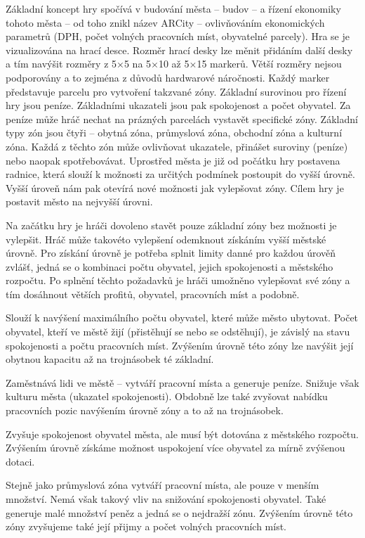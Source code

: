 \documentclass[twoside,12pt]{article}
\begin{document}
Základní koncept hry spočívá v budování města -- budov -- a řízení ekonomiky tohoto města -- od toho znikl název ARCity -- ovlivňováním ekonomických parametrů (DPH, počet volných pracovních míst, obyvatelné parcely). Hra se je vizualizována na hrací desce. Rozměr hrací desky lze měnit přidáním další desky a tím navýšit rozměry z 5$\times$5 na 5$\times$10 až 5$\times$15 markerů. Větší rozměry nejsou podporovány a to zejména z důvodů hardwarové náročnosti. Každý marker představuje parcelu pro vytvoření takzvané zóny. Základní surovinou pro řízení hry jsou peníze. Základními ukazateli jsou pak spokojenost a počet obyvatel.  Za peníze může hráč nechat na prázných parcelách vystavět specifické zóny. Základní typy zón jsou čtyři -- obytná zóna, průmyslová zóna, obchodní zóna a kulturní zóna. Každá z těchto zón může ovlivňovat ukazatele, přinášet suroviny (peníze) nebo naopak spotřebovávat. Uprostřed města je již od počátku hry postavena radnice, která slouží k možnosti za určitých podmínek postoupit do vyšší úrovně. Vyšší úroveň nám pak otevírá nové možnosti jak vylepšovat zóny. Cílem hry je postavit město na nejvyšší úrovni. 

Na začátku hry je hráči dovoleno stavět pouze základní zóny bez možnosti je vylepšit. Hráč může takovéto vylepšení odemknout získáním vyšší městské úrovně. Pro získání úrovně je potřeba splnit limity danné pro každou úrověň zvlášť, jedná se o kombinaci počtu obyvatel, jejich spokojenosti a městského rozpočtu. Po splnění těchto požadavků je hráči umožněno vylepšovat své zóny a tím dosáhnout větších profitů, obyvatel, pracovních míst a podobně.

Slouží k navýšení maximálního počtu obyvatel, které může město ubytovat. Počet obyvatel, kteří ve městě žijí (přistěhují se nebo se odstěhují), je závislý na stavu spokojenosti a počtu pracovních míst. Zvýšením úrovně této zóny lze navýšit její obytnou kapacitu až na trojnásobek té základní.

Zaměstnává lidi ve městě -- vytváří pracovní místa a generuje peníze. Snižuje však kulturu města (ukazatel spokojenosti). Obdobně lze také zvyšovat nabídku pracovních pozic navýšením úrovně zóny a to až na trojnásobek.

Zvyšuje spokojenost obyvatel města, ale musí být dotována z městského rozpočtu. Zvýšením úrovně získáme možnost uspokojení více obyvatel za mírně zvýšenou dotaci.

Stejně jako průmyslová zóna vytváří pracovní místa, ale pouze v menším množství. Nemá však takový vliv na snižování spokojenosti obyvatel. Také generuje malé množství peněz a jedná se o nejdražší zónu. Zvýšením úrovně této zóny zvyšujeme také její přijmy a počet volných pracovních míst. 
\end{document}
